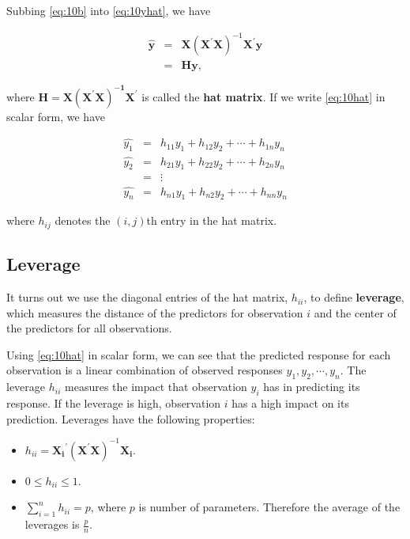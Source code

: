 \documentclass[
]{book}
\providecommand{\tightlist}{%
  \setlength{\itemsep}{0pt}\setlength{\parskip}{0pt}}
\begin{document}
Subbing \eqref{eq:10b} into \eqref{eq:10yhat}, we have

\begin{eqnarray}
\boldsymbol{\hat{y}} &=& \boldsymbol{X} \left(\boldsymbol{X}^{\prime} \boldsymbol{X} \right)^{-1} \boldsymbol{X}^{\prime} \boldsymbol{y} \nonumber \\
                     &=& \boldsymbol{Hy},
\label{eq:10hat}
\end{eqnarray}

where \(\boldsymbol{H} = \boldsymbol{X (X^{\prime}X)^{-1}X^\prime}\) is called the \textbf{hat matrix}. If we write \eqref{eq:10hat} in scalar form, we have

\begin{eqnarray*}
\hat{y_1} &=& h_{11}y_1 + h_{12}y_2 + \cdots + h_{1n}y_n \nonumber \\
\hat{y_2} &=& h_{21}y_1 + h_{22}y_2 + \cdots + h_{2n}y_n \nonumber \\
 &=& \vdots \nonumber \\
\hat{y_n} &=& h_{n1}y_1 + h_{n2}y_2 + \cdots + h_{nn}y_n \nonumber 
\end{eqnarray*}

where \(h_{ij}\) denotes the \((i,j)\)th entry in the hat matrix.

\hypertarget{leverage}{%
\subsection{Leverage}\label{leverage}}

It turns out we use the diagonal entries of the hat matrix, \(h_{ii}\), to define \textbf{leverage}, which measures the distance of the predictors for observation \(i\) and the center of the predictors for all observations.

Using \eqref{eq:10hat} in scalar form, we can see that the predicted response for each observation is a linear combination of observed responses \(y_1, y_2, \cdots, y_n\). The leverage \(h_{ii}\) measures the impact that observation \(y_i\) has in predicting its response. If the leverage is high, observation \(i\) has a high impact on its prediction. Leverages have the following properties:

\begin{itemize}
\tightlist
\item
  \(h_{ii} = \boldsymbol{X_{i}}^{\prime} \left(\boldsymbol{X^{\prime}X} \right)^{-1} \boldsymbol{X_{i}}\).
\item
  \(0\leq h_{ii}\leq 1\).
\item
  \(\sum_{i=1}^n h_{ii}=p\), where \(p\) is number of parameters. Therefore the average of the leverages is \(\frac{p}{n}\).
\end{itemize}
\end{document}

